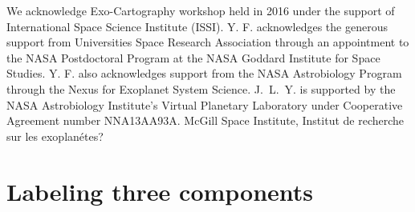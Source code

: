 \documentclass[iop,numberedappendix,apj]{emulateapj}
\begin{document}
\acknowledgements

We acknowledge Exo-Cartography workshop held in 2016 under the support of International Space Science Institute (ISSI). 
Y. F. acknowledges the generous support from Universities Space Research Association through an appointment to the NASA Postdoctoral Program at the NASA Goddard Institute for Space Studies. 
Y. F. also acknowledges support from the NASA Astrobiology Program through the Nexus for Exoplanet System Science. 
J.~L.~Y. is supported by the NASA Astrobiology Institute's Virtual Planetary Laboratory under Cooperative Agreement number NNA13AA93A. 
McGill Space Institute, Institut de recherche sur les exoplan\'etes? 

\newpage



\newpage

\appendix

\newpage

\section{Labeling three components}
\end{document}
